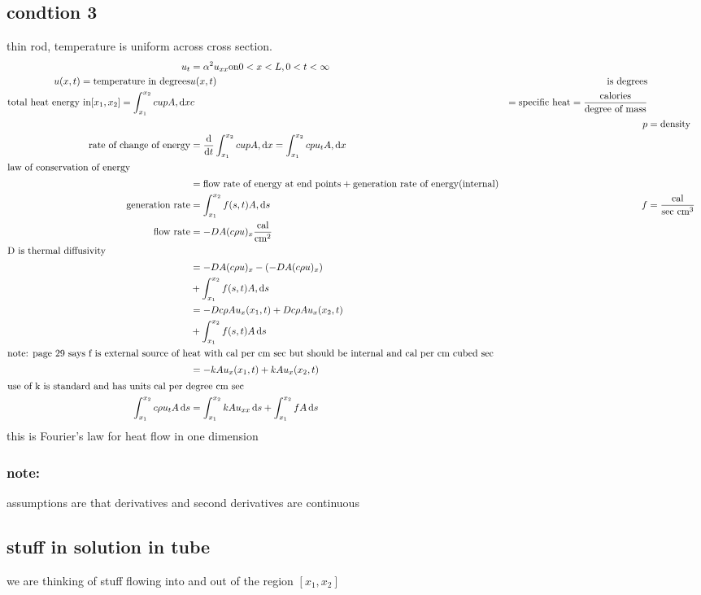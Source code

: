 \documentclass{article}
\begin{document}
\subsection*{condtion 3}
thin rod, temperature is uniform across cross section.
\begin{align*}
  u_t&=\alpha^2u_{xx} \text{on} 0<x<L, 0<t<\infty\\
  u(x,t)=\text{temperature in degrees}& u(x,t)& \text{is degrees}\\
  \text{total heat energy in} [x_1,x_2]=\int_{x_1}^{x_2}{cupA,\mathrm{d}x} & c&=\text{specific heat}=\frac{\text{calories}}{\text{degree of mass}}\\
  &&p&=\text{density}\\
  \text{rate of change of energy}&=\frac{\mathrm{d}}{\mathrm{d}t}\int_{x_1}^{x_2}{cupA,\mathrm{d}x}=\int_{x_1}^{x_2}{cpu_t A,\mathrm{d}x}\\
  \intertext{law of conservation of energy}
  &=\text{flow rate of energy at end points}+\text{generation rate of energy(internal)}\\
  \text{generation rate}&=\int_{x_1}^{x_2}{f(s,t)A,\mathrm{d}s} & f&=\frac{\text{cal}}{\text{sec cm}^3}\\
  \text{flow rate}&=-DA(c\rho u)_x \frac{\text{cal}}{\text{cm}^2}\\
  \intertext{D is thermal diffusivity}
  &=-DA(c\rho u)_x-(-DA(c\rho u)_x)\\
  &+\int_{x_1}^{x_2}{f(s,t)A,\mathrm{d}s}\\
  &=-Dc\rho Au_x(x_1,t)+Dc\rho Au_x(x_2,t)\\
  &+\int_{x_1}^{x_2}{f(s,t)A\,\mathrm{d}s}\\
  \intertext{note: page 29 says f is external source of heat with cal per cm sec but should be internal and cal per cm cubed sec}
  &=-kAu_x(x_1,t)+kAu_x(x_2,t)\\
  \intertext{use of k is standard and has units cal per degree cm sec}
  \int_{x_1}^{x_2}{c\rho u_tA\,\mathrm{d}s}&=\int_{x_1}^{x_2}{kAu_{xx}\,\mathrm{d}s}+\int_{x_1}^{x_2}{fA\,\mathrm{d}s}
\end{align*}
this is Fourier's law for heat flow in one dimension

\subsubsection*{note:}assumptions are that derivatives and second derivatives are continuous
\subsection*{stuff in solution in tube}
we are thinking of stuff flowing into and out of the region $[x_1,x_2]$
\end{document}
